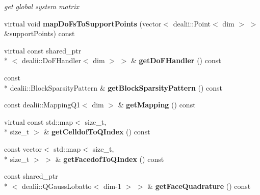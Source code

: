 \begin{DoxyCompactItemize}
\begin{DoxyCompactList}\small\item\em get global system matrix \end{DoxyCompactList}\item 
\hypertarget{classnatrium_1_1SEDGMinLee_ab01fe7f989aed26cb5547eaba8ddb4ee}{virtual void {\bfseries map\-Do\-Fs\-To\-Support\-Points} (vector$<$ dealii\-::\-Point$<$ dim $>$ $>$ \&support\-Points) const }\label{classnatrium_1_1SEDGMinLee_ab01fe7f989aed26cb5547eaba8ddb4ee}

\item 
\hypertarget{classnatrium_1_1SEDGMinLee_a3ffd3d7bc5aae9dbb5a021d7e4913f65}{virtual const shared\-\_\-ptr\\*
$<$ dealii\-::\-Do\-F\-Handler$<$ dim $>$ $>$ \& {\bfseries get\-Do\-F\-Handler} () const }\label{classnatrium_1_1SEDGMinLee_a3ffd3d7bc5aae9dbb5a021d7e4913f65}

\item 
\hypertarget{classnatrium_1_1SEDGMinLee_a10acabaac20a992130e88fb9bd395d31}{const \\*
dealii\-::\-Block\-Sparsity\-Pattern \& {\bfseries get\-Block\-Sparsity\-Pattern} () const }\label{classnatrium_1_1SEDGMinLee_a10acabaac20a992130e88fb9bd395d31}

\item 
\hypertarget{classnatrium_1_1SEDGMinLee_a7d093da19c6796a3021f5d3f4beab542}{const dealii\-::\-Mapping\-Q1$<$ dim $>$ \& {\bfseries get\-Mapping} () const }\label{classnatrium_1_1SEDGMinLee_a7d093da19c6796a3021f5d3f4beab542}

\item 
\hypertarget{classnatrium_1_1SEDGMinLee_aec38323cbd34487a73b4f62f0a310ceb}{virtual const std\-::map$<$ size\-\_\-t, \\*
size\-\_\-t $>$ \& {\bfseries get\-Celldof\-To\-Q\-Index} () const }\label{classnatrium_1_1SEDGMinLee_aec38323cbd34487a73b4f62f0a310ceb}

\item 
\hypertarget{classnatrium_1_1SEDGMinLee_a8b7d94c90ccfa5e341d854059d883f57}{const vector$<$ std\-::map$<$ size\-\_\-t, \\*
size\-\_\-t $>$ $>$ \& {\bfseries get\-Facedof\-To\-Q\-Index} () const }\label{classnatrium_1_1SEDGMinLee_a8b7d94c90ccfa5e341d854059d883f57}

\item 
\hypertarget{classnatrium_1_1SEDGMinLee_a653928dc9f0dd3715389b28196cab7bb}{const shared\-\_\-ptr\\*
$<$ dealii\-::\-Q\-Gauss\-Lobatto$<$ dim-\/1 $>$ $>$ \& {\bfseries get\-Face\-Quadrature} () const }\label{classnatrium_1_1SEDGMinLee_a653928dc9f0dd3715389b28196cab7bb}


\end{DoxyCompactItemize}
